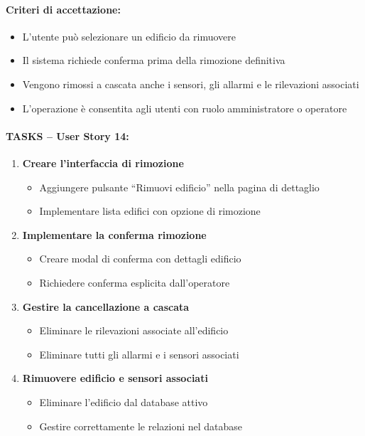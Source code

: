 \paragraph*{Criteri di accettazione:}
\begin{itemize}
    \item L'utente può selezionare un edificio da rimuovere
    \item Il sistema richiede conferma prima della rimozione definitiva
    \item Vengono rimossi a cascata anche i sensori, gli allarmi e le rilevazioni associati
    \item L'operazione è consentita agli utenti con ruolo amministratore o operatore
\end{itemize}

\paragraph*{TASKS – User Story 14:}
\begin{enumerate}
    \item \textbf{Creare l'interfaccia di rimozione}
    \begin{itemize}
        \item Aggiungere pulsante ``Rimuovi edificio'' nella pagina di dettaglio
        \item Implementare lista edifici con opzione di rimozione
    \end{itemize}
    \item \textbf{Implementare la conferma rimozione}
    \begin{itemize}
        \item Creare modal di conferma con dettagli edificio
        \item Richiedere conferma esplicita dall'operatore
    \end{itemize}
    \item \textbf{Gestire la cancellazione a cascata}
    \begin{itemize}
        \item Eliminare le rilevazioni associate all'edificio
        \item Eliminare tutti gli allarmi e i sensori associati
    \end{itemize}
    \item \textbf{Rimuovere edificio e sensori associati}
    \begin{itemize}
        \item Eliminare l'edificio dal database attivo
        \item Gestire correttamente le relazioni nel database
    \end{itemize}
\end{enumerate}


